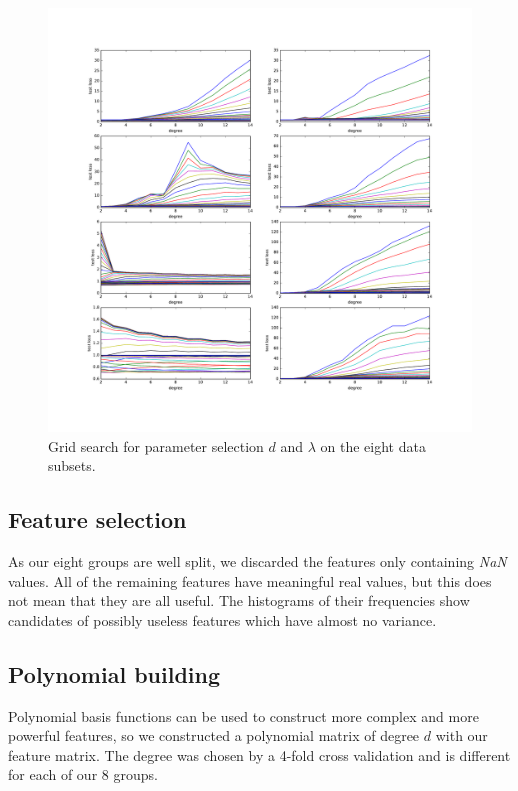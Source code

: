 \documentclass[10pt,conference,compsocconf]{IEEEtran}
\begin{document}
\begin{figure}[tbp] %
  \centering
  \includegraphics[width=\columnwidth]{img/cross_validation_lot.pdf}
  \caption{Grid search for parameter selection $d$ and $\lambda$ on the eight data subsets. }
  \vspace{-3mm}
  \label{param}
\end{figure}

\subsection{Feature selection}
As our eight groups are well split, we discarded the features only containing \emph{NaN} values. All of the remaining features have meaningful real values, but this does not mean that they are all useful. The histograms of their frequencies show candidates of possibly useless features which have almost no variance. %



\subsection{Polynomial building}
Polynomial basis functions can be used to construct more complex and more powerful features, so we constructed a polynomial matrix of degree $d$ with our feature matrix. The degree was chosen by a 4-fold cross validation and is different for each of our 8 groups.
\end{document}
